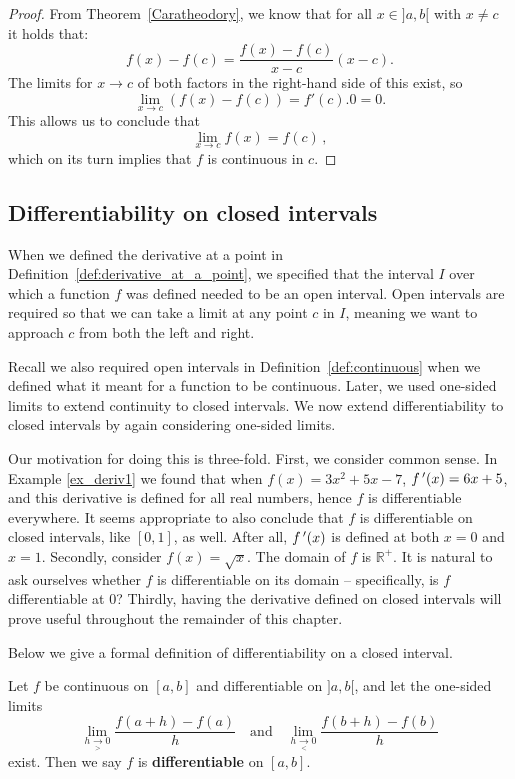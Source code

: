 \begin{proof}
From Theorem~\ref{Caratheodory}, we know that for all  $x \in ]a,b[$ with $x \neq c$ it holds that:
$$
f(x) - f(c) = \frac{f(x) - f(c)}{x - c}(x - c).
$$
The limits for $x \longrightarrow c$ of both factors in the right-hand side of this exist, so 
$$
\lim_{x \rightarrow c} \left(f(x) - f(c)\right) = f'(c).0 = 0.
$$
This allows us to conclude that
$$
\lim_{x \rightarrow c} f(x) = f(c)\,,
$$
which on its turn implies that $f$ is continuous in $c$.
\end{proof}


\fi

\fi


\subsection{Differentiability on closed intervals}
When we defined the derivative at a point in Definition~\ref{def:derivative_at_a_point}, we specified that the interval $I$ over which a function $f$ was defined needed to be an open interval. Open intervals are required so that we can take a limit at any point $c$ in $I$, meaning we want to approach $c$ from both the left and right.

Recall we also required open intervals in Definition~\ref{def:continuous} when we defined what it meant for a function to be continuous. Later, we used one-sided limits to extend continuity to closed intervals. We now extend differentiability to closed intervals by again considering one-sided limits.

Our motivation for doing this is three-fold. First, we consider common sense. In Example \ref{ex_deriv1} we found that when $f(x) =  3x^2+5x-7$, $f\,'(x) = 6x+5$, and this derivative is defined for all real numbers, hence $f$ is differentiable everywhere. It seems appropriate to also conclude that $f$ is differentiable on closed intervals, like $[0,1]$, as well. After all, $f\,'(x)$ is defined at both $x=0$ and $x=1$. Secondly, consider $f(x) = \sqrt{x}$. The domain of $f$ is $\mathbb{R}^+$. It is natural to ask ourselves whether $f$ is differentiable on its domain -- specifically, is $f$ differentiable at $0$? Thirdly, having the derivative defined on closed intervals will prove  useful throughout the remainder of this chapter. 

Below we give a formal definition of differentiability on a closed interval.

\begin{definition}\label{def:diff_closed}
Let $f$ be continuous on $[a,b]$ and differentiable on $]a,b[$, and let the one-sided limits 
$$\lim_{h\underset{>}{\rightarrow}0}\frac{f(a+h)-f(a)}{h}\quad\text{and}\quad\lim_{h\underset{<}{\rightarrow}0}\frac{f(b+h)-f(b)}{h}$$
 exist. Then we say $f$ is \textbf{differentiable} on $[a,b]$.
\end{definition}


